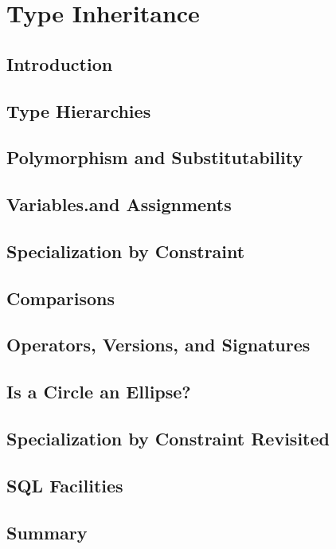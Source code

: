 \documentclass{book}
\begin{document}
\chapter{Type Inheritance}

\section{Introduction}

\section{Type Hierarchies}

\section{Polymorphism and Substitutability}

\section{Variables.and Assignments}

\section{Specialization by Constraint}

\section{Comparisons}

\section{Operators, Versions, and Signatures }

\section{Is a Circle an Ellipse?}

\section{Specialization by Constraint Revisited }

\section{SQL Facilities}

\section{Summary}
\end{document}
